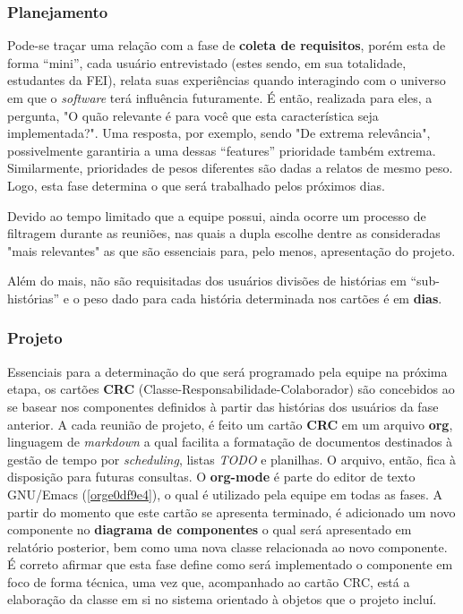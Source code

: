 \documentclass[11pt, a4paper]{article}
\begin{document}
\subsubsection{Planejamento}
\label{sec:org98c08c4}
Pode-se traçar uma relação com a fase de \textbf{coleta de requisitos}, porém esta
de forma ``mini'', cada usuário entrevistado (estes sendo, em sua totalidade,
estudantes da FEI), relata suas experiências quando interagindo com o universo
em que o \emph{software} terá influência futuramente. É então, realizada para eles,
a pergunta, "O quão relevante é para você que esta característica seja implementada?".
Uma resposta, por exemplo, sendo "De extrema relevância", possivelmente
garantiria a uma dessas ``features'' prioridade também extrema. Similarmente,
prioridades de pesos diferentes são dadas a relatos de mesmo peso. Logo,
esta fase determina o que será trabalhado pelos próximos dias. 

Devido ao tempo limitado que a equipe possui, ainda ocorre um processo de
filtragem durante as reuniões, nas quais a dupla escolhe dentre as consideradas
"mais relevantes" as que são essenciais para, pelo menos, apresentação do projeto.

Além do mais, não são requisitadas dos usuários divisões de histórias em ``sub-histórias''
e o peso dado para cada história determinada nos cartões é em \textbf{dias}.  

\subsubsection{Projeto}
\label{sec:orgd29618a}
Essenciais para a determinação do que será programado pela equipe na próxima
etapa, os cartões \textbf{CRC} (Classe-Responsabilidade-Colaborador) são concebidos 
ao se basear nos componentes definidos à partir das histórias dos usuários
da fase anterior. A cada reunião de projeto, é feito um cartão \textbf{CRC} em
um arquivo \textbf{org}, linguagem de \emph{markdown} a qual facilita a formatação de
documentos destinados à gestão de tempo por \emph{scheduling}, listas \emph{TODO} e
planilhas. O arquivo, então, fica à disposição para futuras consultas.
O \textbf{org-mode} é parte do editor de texto GNU/Emacs (\ref{orge0df9e4}),
o qual é utilizado pela equipe
em todas as fases. A partir do momento que este cartão se apresenta terminado,
é adicionado um novo componente no \textbf{diagrama de componentes} o qual será
apresentado em relatório posterior, bem como uma nova classe relacionada
ao novo componente. É correto afirmar que esta fase define como será implementado
o componente em foco de forma técnica, uma vez que, acompanhado ao cartão CRC,
está a elaboração da classe em si no sistema orientado à objetos que o projeto
incluí.
\end{document}
